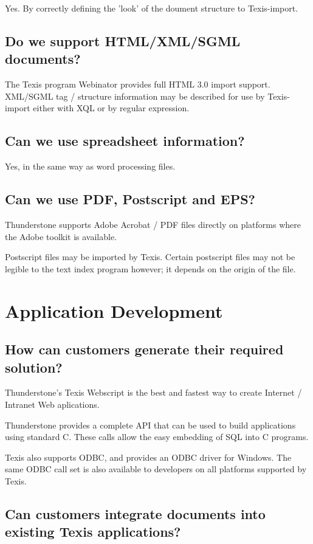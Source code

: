 Yes. By correctly defining the 'look' of the doument structure to Texis-import.

\subsection{Do we support HTML/XML/SGML documents?}

The Texis program Webinator provides full HTML 3.0 import support.
XML/SGML tag / structure information may be described for use by Texis-import
either with XQL or by regular expression.

\subsection{Can we use spreadsheet information?}

Yes, in the same way as word processing files.

\subsection{Can we use PDF, Postscript and EPS?}

Thunderstone supports Adobe Acrobat / PDF files directly on platforms
where the Adobe toolkit is available.

Postscript files may be imported by Texis. Certain postscript files may not be
legible to the text index program however; it depends on the origin
of the file.

\section{Application Development}

\subsection{How can customers generate their required solution?}

Thunderstone's Texis Webscript is the best and fastest way to create
Internet / Intranet Web aplications.

Thunderstone provides a complete API that can be used to build
applications using standard C.  These calls allow the easy embedding
of SQL into C programs.

Texis also supports ODBC, and provides an ODBC driver for Windows.
The same ODBC call set is also available to developers on all
platforms supported by Texis.

\subsection{Can customers integrate documents into existing Texis applications?}

